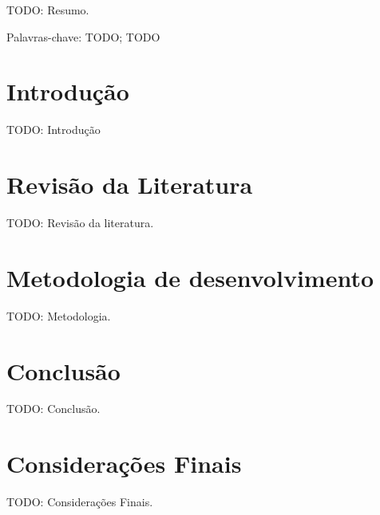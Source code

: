\documentclass[font=plain,chapter=TITLE,section=Title,espaco=duplo,tocpage=plain,appendix=Name,floatnumber=continuous]{abnt}
\begin{document}


\UTPCapa
\UTPFalsaFolhaDeRosto
\UTPFolhaDeRosto

\begin{resumo}
TODO: Resumo.

Palavras-chave: TODO; TODO
\end{resumo}

\listoffigures
\listoftables
\listadequadros
\sumario

\chapter{Introdução}

TODO: Introdução

\chapter{Revisão da Literatura}

TODO: Revisão da literatura.

\chapter{Metodologia de desenvolvimento}

TODO: Metodologia.

\chapter{Conclusão}

TODO: Conclusão.

\chapter{Considerações Finais}

TODO: Considerações Finais.

%
%

\end{document}
